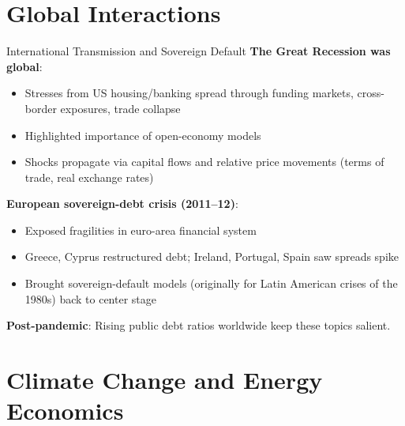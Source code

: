 \documentclass[blue]{beamer}
\begin{document}
\section{Global Interactions}

\begin{frame}{International Transmission and Sovereign Default}
	\textbf{The Great Recession was global}:
	\vspace{-6pt}
	\begin{itemize}
		\item Stresses from US housing/banking spread through funding markets, cross-border exposures, trade collapse
		\item Highlighted importance of open-economy models
		\item Shocks propagate via capital flows and relative price movements (terms of trade, real exchange rates)
	\end{itemize}
	

	\textbf{European sovereign-debt crisis (2011--12)}:
	\vspace{-6pt}
	\begin{itemize}
		\item Exposed fragilities in euro-area financial system
		\item Greece, Cyprus restructured debt; Ireland, Portugal, Spain saw spreads spike
		\item Brought sovereign-default models (originally for Latin American crises of the 1980s) back to center stage
	\end{itemize}
	

	\textbf{Post-pandemic}: Rising public debt ratios worldwide keep these topics salient.
\end{frame}

\section{Climate Change and Energy Economics}
\end{document}

